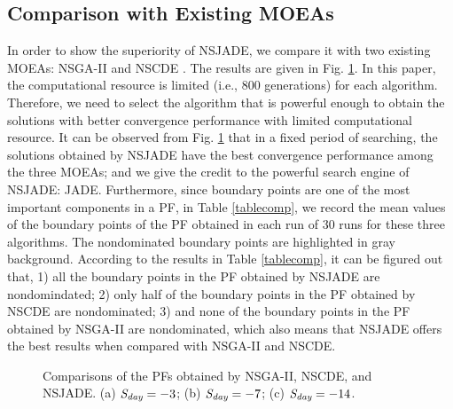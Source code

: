 \documentclass[journal]{IEEEtran}
\theoremstyle{definition}
\begin{document}
\subsection{Comparison with Existing MOEAs}
In order to show the superiority of NSJADE, we compare it with two existing MOEAs: NSGA-II \cite{deb2002fast} and NSCDE \cite{tang2013multiobjective}. The results are given in Fig. \ref{figcomp}. In this paper, the computational resource is limited (i.e., 800 generations) for each algorithm. Therefore, we need to select the algorithm that is powerful enough to obtain the solutions with better convergence performance with limited computational resource. It can be observed from Fig. \ref{figcomp} that in a fixed period of searching, the solutions obtained by NSJADE have the best convergence performance among the three MOEAs; and we give the credit to the powerful search engine of NSJADE: JADE.
Furthermore, since boundary points are one of the most important components in a PF, in Table \ref{tablecomp}, we record the mean values of the boundary points of the PF obtained in each run of 30 runs for these three algorithms. The nondominated boundary points are highlighted in gray background. According to the results in Table \ref{tablecomp}, it can be figured out that, 1) all the boundary points in the PF obtained by NSJADE are nondomindated; 2) only half of the boundary points in the PF obtained by NSCDE are nondominated; 3) and none of the boundary points in the PF obtained by NSGA-II are nondominated, which also means that NSJADE offers the best results when compared with NSGA-II and NSCDE.
\begin{figure}
\centering
{}
\caption{Comparisons of the PFs obtained by NSGA-II, NSCDE, and NSJADE. (a) $\emph{S}_\emph{day}=-3$; (b) $\emph{S}_\emph{day}=-7$; (c) $\emph{S}_\emph{day}=-14$.} \label{figcomp}
\end{figure}
\end{document}
